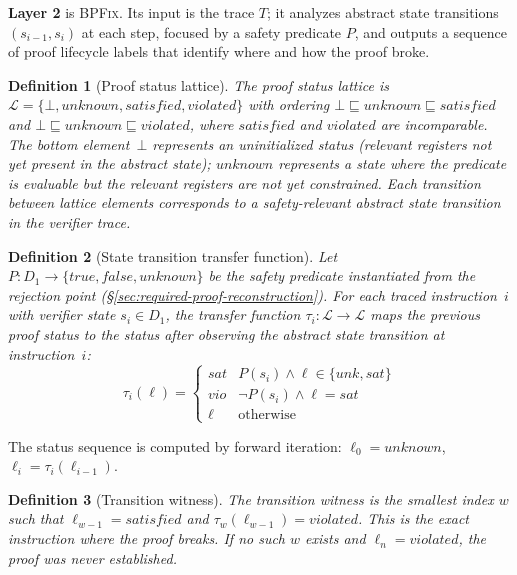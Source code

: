 \documentclass[sigplan,10pt,anonymous,review]{acmart}
\newcommand{\sys}{\textsc{BPFix}\xspace}
\newtheorem{definition}{Definition}
\begin{document}
\textbf{Layer 2} is \sys.  Its input is the trace $T$; it analyzes
abstract state transitions $(s_{i-1}, s_i)$ at each step, focused by a
safety predicate $P$, and outputs a sequence of proof lifecycle labels
that identify where and how the proof broke.

\begin{definition}[Proof status lattice]
\label{def:lattice}
The proof status lattice is
$\mathcal{L} = \{\bot, \mathit{unknown}, \mathit{satisfied}, \mathit{violated}\}$
with ordering
$\bot \sqsubseteq \mathit{unknown} \sqsubseteq \mathit{satisfied}$
and
$\bot \sqsubseteq \mathit{unknown} \sqsubseteq \mathit{violated}$,
where $\mathit{satisfied}$ and $\mathit{violated}$ are incomparable.
The bottom element~$\bot$ represents an uninitialized status
(relevant registers not yet present in the abstract state);
$\mathit{unknown}$ represents a state where the predicate is evaluable but the
relevant registers are not yet constrained.  Each transition between lattice
elements corresponds to a safety-relevant abstract state transition in the
verifier trace.
\end{definition}

\begin{definition}[State transition transfer function]
\label{def:transfer}
Let $P : D_1 \to \{\mathit{true}, \mathit{false}, \mathit{unknown}\}$ be the
safety predicate instantiated from the rejection point
(\S\ref{sec:required-proof-reconstruction}).
For each traced instruction~$i$ with verifier state $s_i \in D_1$,
the transfer function $\tau_i : \mathcal{L} \to \mathcal{L}$ maps the
previous proof status to the status after observing the abstract state
transition at instruction~$i$:
\[
\tau_i(\ell) = \begin{cases}
  \mathit{sat} & P(s_i) \land \ell \in \{\mathit{unk}, \mathit{sat}\} \\[2pt]
  \mathit{vio} & \neg P(s_i) \land \ell = \mathit{sat} \\[2pt]
  \ell         & \text{otherwise}
\end{cases}
\]
\end{definition}

\noindent
The status sequence is computed by forward iteration:
$\ell_0 = \mathit{unknown}$,\;
$\ell_i = \tau_i(\ell_{i-1})$.

\begin{definition}[Transition witness]
\label{def:witness}
The transition witness is the smallest index $w$ such that
$\ell_{w-1} = \mathit{satisfied}$ and $\tau_w(\ell_{w-1}) = \mathit{violated}$.
This is the exact instruction where the proof breaks.
If no such $w$ exists and $\ell_n = \mathit{violated}$, the proof was
\emph{never established}.
\end{definition}
\end{document}
